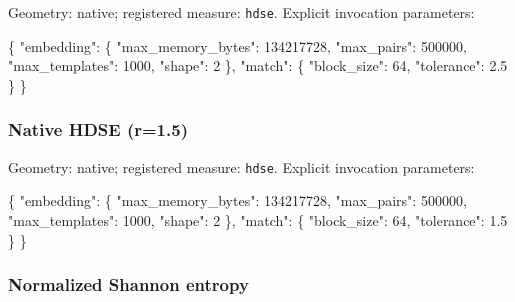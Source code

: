 \documentclass[
  english,
  11pt,
]{article}
\newenvironment{Shaded}{}{}
\newcommand{\DataTypeTok}[1]{\textcolor[rgb]{0.56,0.13,0.00}{#1}}
\newcommand{\DecValTok}[1]{\textcolor[rgb]{0.25,0.63,0.44}{#1}}
\newcommand{\FloatTok}[1]{\textcolor[rgb]{0.25,0.63,0.44}{#1}}
\newcommand{\FunctionTok}[1]{\textcolor[rgb]{0.02,0.16,0.49}{#1}}
\begin{document}
Geometry: native; registered measure: \texttt{hdse}. Explicit invocation
parameters:

\begin{Shaded}
\begin{Highlighting}[]
\FunctionTok{\{}
  \DataTypeTok{"embedding"}\FunctionTok{:} \FunctionTok{\{}
    \DataTypeTok{"max\_memory\_bytes"}\FunctionTok{:} \DecValTok{134217728}\FunctionTok{,}
    \DataTypeTok{"max\_pairs"}\FunctionTok{:} \DecValTok{500000}\FunctionTok{,}
    \DataTypeTok{"max\_templates"}\FunctionTok{:} \DecValTok{1000}\FunctionTok{,}
    \DataTypeTok{"shape"}\FunctionTok{:} \DecValTok{2}
  \FunctionTok{\},}
  \DataTypeTok{"match"}\FunctionTok{:} \FunctionTok{\{}
    \DataTypeTok{"block\_size"}\FunctionTok{:} \DecValTok{64}\FunctionTok{,}
    \DataTypeTok{"tolerance"}\FunctionTok{:} \FloatTok{2.5}
  \FunctionTok{\}}
\FunctionTok{\}}
\end{Highlighting}
\end{Shaded}

\subsubsection{Native HDSE (r=1.5)}\label{native-hdse-r1.5}

Geometry: native; registered measure: \texttt{hdse}. Explicit invocation
parameters:

\begin{Shaded}
\begin{Highlighting}[]
\FunctionTok{\{}
  \DataTypeTok{"embedding"}\FunctionTok{:} \FunctionTok{\{}
    \DataTypeTok{"max\_memory\_bytes"}\FunctionTok{:} \DecValTok{134217728}\FunctionTok{,}
    \DataTypeTok{"max\_pairs"}\FunctionTok{:} \DecValTok{500000}\FunctionTok{,}
    \DataTypeTok{"max\_templates"}\FunctionTok{:} \DecValTok{1000}\FunctionTok{,}
    \DataTypeTok{"shape"}\FunctionTok{:} \DecValTok{2}
  \FunctionTok{\},}
  \DataTypeTok{"match"}\FunctionTok{:} \FunctionTok{\{}
    \DataTypeTok{"block\_size"}\FunctionTok{:} \DecValTok{64}\FunctionTok{,}
    \DataTypeTok{"tolerance"}\FunctionTok{:} \FloatTok{1.5}
  \FunctionTok{\}}
\FunctionTok{\}}
\end{Highlighting}
\end{Shaded}

\subsubsection{Normalized Shannon
entropy}\label{normalized-shannon-entropy}
\end{document}
